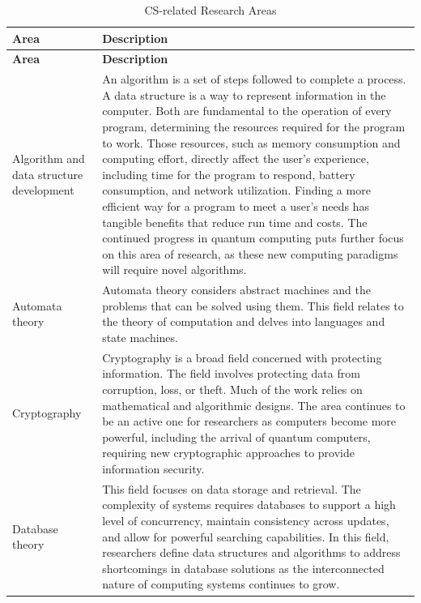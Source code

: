 
\begin{longtable}[H]{p{.8in}|p{3.6in}}
	\caption{CS-related Research Areas}
	\label{tab:table1}\\
	\textbf{Area} & \textbf{Description}\\
	\hline
	\endfirsthead
	\textbf{Area} & \textbf{Description}\\
	\endhead
	\Tstrut Algorithm and data structure development & An algorithm is a set of steps followed to complete a process. A data structure is a way to represent information in the computer. Both are fundamental to the operation of every program, determining the resources required for the program to work. Those resources, such as memory consumption and computing effort, directly affect the user's experience, including time for the program to respond, battery consumption, and network utilization. Finding a more efficient way for a program to meet a user's needs has tangible benefits that reduce run time and costs. The continued progress in quantum computing puts further focus on this area of research, as these new computing paradigms will require novel algorithms.\\
	\hline
	\Tstrut Automata theory & Automata theory considers abstract machines and the problems that can be solved using them. This field relates to the theory of computation and delves into languages and state machines.\\
	\hline
	\Tstrut Cryptography & Cryptography is a broad field concerned with protecting information. The field involves protecting data from corruption, loss, or theft. Much of the work relies on mathematical and algorithmic designs. The area continues to be an active one for researchers as computers become more powerful, including the arrival of quantum computers, requiring new cryptographic approaches to provide information security.\\
	\hline
	\Tstrut Database theory & This field focuses on data storage and retrieval. The complexity of systems requires databases to support a high level of concurrency, maintain consistency across updates, and allow for powerful searching capabilities. In this field, researchers define data structures and algorithms to address shortcomings in database solutions as the interconnected nature of computing systems continues to grow.\\

\end{longtable}
